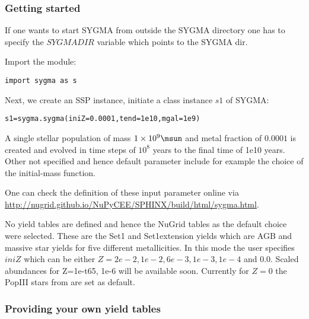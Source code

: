 \subsubsection{Getting started}

If one wants to start SYGMA from outside the SYGMA directory
one has to specify the $SYGMADIR$ variable which
points to the SYGMA dir.

Import the module:

\begin{verbatim}
import sygma as s
\end{verbatim}

Next, we create an SSP instance, initiate a class instance $s1$ of SYGMA:


\begin{verbatim}
s1=sygma.sygma(iniZ=0.0001,tend=1e10,mgal=1e9)
\end{verbatim}

A single stellar population of mass $1\times10^{9}\msun$ and metal fraction
of $0.0001$ is created and evolved in time steps of $10^{8}$ years
to the final time of 1e10 years. Other not specified and hence
default parameter include for example the choice of the initial-mass function.


One can check the definition of these input parameter online via
\url{http://nugrid.github.io/NuPyCEE/SPHINX/build/html/sygma.html}.


No yield tables are defined and hence the NuGrid tables as the
default choice were selected. These are the Set1 and Set1extension
yields which are
AGB and massive star yields for five different metallicities.
In this mode the user specifies $iniZ$
which can be either $Z=2e-2, 1e-2, 6e-3, 1e-3, 1e-4$ and $0.0$.
Scaled abundances for Z=1e-t65, 1e-6 will be available soon.
Currently for $Z=0$ the PopIII stars from \cite{heger:10} are set
as default.

\subsubsection{Providing your own yield tables}

